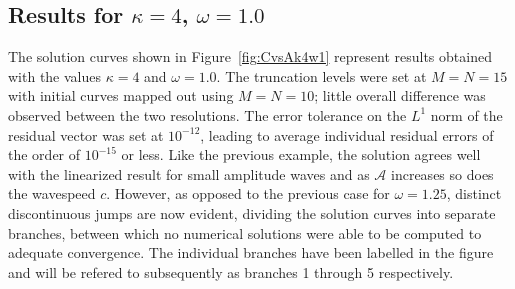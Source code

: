 \subsection[Results for $\kappa=4$, $\omega=1.0$]{Results for \boldmath$\kappa=4$, $\omega=1.0$}
\label{subsec:incomnlk4w1}
The solution curves shown in Figure~\ref{fig:CvsAk4w1} represent results obtained with the values $\kappa=4$ and $\omega=1.0$. The truncation levels were set at $M=N=15$ with initial curves mapped out using $M=N=10$; little overall difference was observed between the two resolutions. The error tolerance on the $L^1$ norm of the residual vector was set at $10^{-12}$, leading to average individual residual errors of the order of $10^{-15}$ or less. Like the previous example, the solution agrees well with the linearized result for small amplitude waves and as $\mathcal{A}$ increases so does the wavespeed $c$. However, as opposed to the previous case for $\omega=1.25$, distinct discontinuous jumps are now evident, dividing the solution curves into separate branches, between which no numerical solutions were able to be computed to adequate convergence. The individual branches have been labelled in the figure and will be refered to subsequently as branches 1 through 5 respectively.

